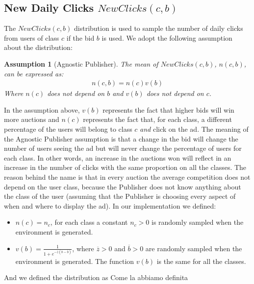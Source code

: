 \documentclass[11pt]{article} %
\newtheorem*{assumption}{Assumption}
\begin{document}
\subsection{New Daily Clicks $NewClicks(c,b)$}
The $NewClicks(c,b)$ distribution is used to sample the number of daily clicks from users of class $c$ if the bid $b$ is used.
\newline
\newline
We adopt the following assumption about the distribution: 
\begin{assumption}[Agnostic Publisher] The mean of $NewClicks(c,b)$, $n(c,b)$, can be expressed as:
\begin{align*}
n(c,b)=n(c)v(b)
\end{align*}
Where $n(c)$ does not depend on $b$ and $v(b)$ does not depend on $c$.
\end{assumption}
In the assumption above, $v(b)$ represents the fact that higher bids will win more auctions and $n(c)$ represents the fact that, for each class, a different percentage of the users will belong to class $c$ \textit{and} click on the ad. The meaning of the Agnostic Publisher assumption is that a change in the bid will change the number of users seeing the ad but will never change the percentage of users for each class. In other words, an increase in the auctions won will reflect in an increase in the number of clicks with the same proportion on all the classes. The reason behind the name is that in every auction the average competition does not depend on the user class, because the Publisher does not know anything about the class of the user (assuming that the Publisher is choosing every aspect of when and where to display the ad).
\newline
\newline
In our implementation we defined:
\begin{itemize}
\item $n(c)=n_c$, for each class a constant $n_c > 0$ is randomly sampled when the environment is generated.
\item $v(b)=\frac{1}{1+e^{-\overline z(b-\overline b)}}$, where $\overline z > 0$ and $\overline b > 0$ are randomly sampled when the environment is generated. The function $v(b)$ is the same for all the classes.
\end{itemize}
And we defined the distribution as
{\color{red}Come la abbiamo definita}
\end{document}
